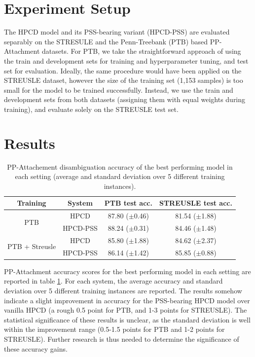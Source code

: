 \section{Experiment Setup}

The HPCD model and its PSS-bearing variant (HPCD-PSS) are evaluated separably on the STRESULE and the Penn-Treebank (PTB) based PP-Attachment datasets. For PTB, we take the straightforward approach of using the train and development sets for training and hyperparameter tuning, and test set for evaluation. Ideally, the same procedure would have been applied on the STREUSLE dataset, however the size of the training set (1,153 samples) is too small for the model to be trained successfully. Instead, we use the train and development sets from both datasets (assigning them with equal weights during training), and evaluate solely on the STREUSLE test set. 

\section{Results}

\begin{table}[]
    \setlength{\tabcolsep}{10pt} %
    \renewcommand{\arraystretch}{1.5}
    \newcommand{\score}[2]{#1 {\footnotesize ($\pm$#2)}}
    \centering
    \begin{tabular}{c|c|c|c}
         Training                        & System   & PTB test acc. & STREUSLE test acc.\\ \hline
         \multirow{2}{*}{PTB}            & HPCD     & \score{87.80}{0.46} & \score{81.54}{1.88}         \\ 
                                         & HPCD-PSS & \score{88.24}{0.31} & \score{84.46}{1.48}         \\ \hline
         \multirow{2}{*}{PTB + Streusle} & HPCD     & \score{85.80}{1.88} & \score{84.62}{2.37}         \\ 
                                         & HPCD-PSS & \score{86.14}{1.42} & \score{85.85}{0.88}         \\ \hline
    \end{tabular}
    \caption{PP-Attachement disambiguation accuracy of the best performing model in each setting (average and standard deviation over 5 different training instances).}
    \label{tab:hpcdresults}
\end{table}

PP-Attachment accuracy scores for the best performing model in each setting are reported in table \ref{tab:hpcdresults}. For each system, the average accuracy and standard deviation over 5 different training instances are reported. The results somehow indicate a slight improvement in accuracy for the PSS-bearing HPCD model over vanilla HPCD (a rough 0.5 point for PTB, and 1-3 points for STREUSLE). The statistical significance of these results is unclear, as the standard deviation is well within the improvement range (0.5-1.5 points for PTB and 1-2 points for STREUSLE). Further research is thus needed to determine the significance of these accuracy gains. 

